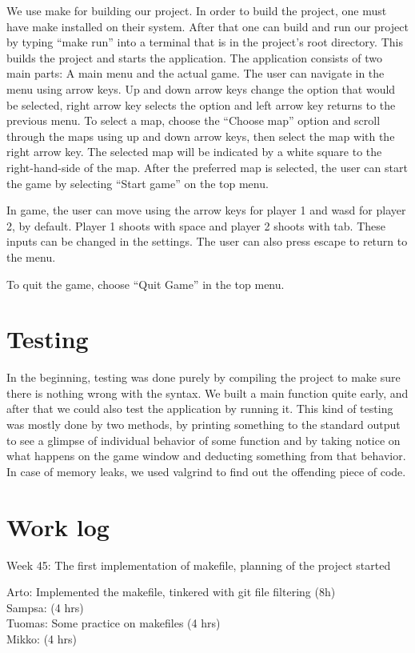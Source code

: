 \documentclass{article} %
\begin{document}
We use make for building our project. In order to build the project, one must have make installed on their system. After that one can build and run our project by typing “make run” into a terminal that is in the project’s root directory. This builds the project and starts the application.
The application consists of two main parts: A main menu and the actual game. The user can navigate in the menu using arrow keys. Up and down arrow keys change the option that would be selected, right arrow key selects the option and left arrow key returns to the previous menu. To select a map, choose the “Choose map” option and scroll through the maps using up and down arrow keys, then select the map with the right arrow key. The selected map will be indicated by a white square to the right-hand-side of the map. After the preferred map is selected, the user can start the game by selecting “Start game” on the top menu.

In game, the user can move using the arrow keys for player 1 and wasd for player 2, by default. Player 1 shoots with space and player 2 shoots with tab. These inputs can be changed in the settings. The user can also press escape to return to the menu. 

To quit the game, choose “Quit Game” in the top menu. 

\section{Testing}

In the beginning, testing was done purely by compiling the project to make sure there is nothing wrong with the syntax. We built a main function quite early, and after that we could also test the application by running it. This kind of testing was mostly done by two methods, by printing something to the standard output to see a glimpse of individual behavior of some function and by taking notice on what happens on the game window and deducting something from that behavior. In case of memory leaks, we used valgrind to find out the offending piece of code.

\section{Work log}

Week 45: The first implementation of makefile, planning of the project started

Arto: Implemented the makefile, tinkered with git file filtering (8h)\\
Sampsa: (4 hrs)\\
Tuomas: Some practice on makefiles (4 hrs) \\
Mikko: (4 hrs)\\
\end{document}

